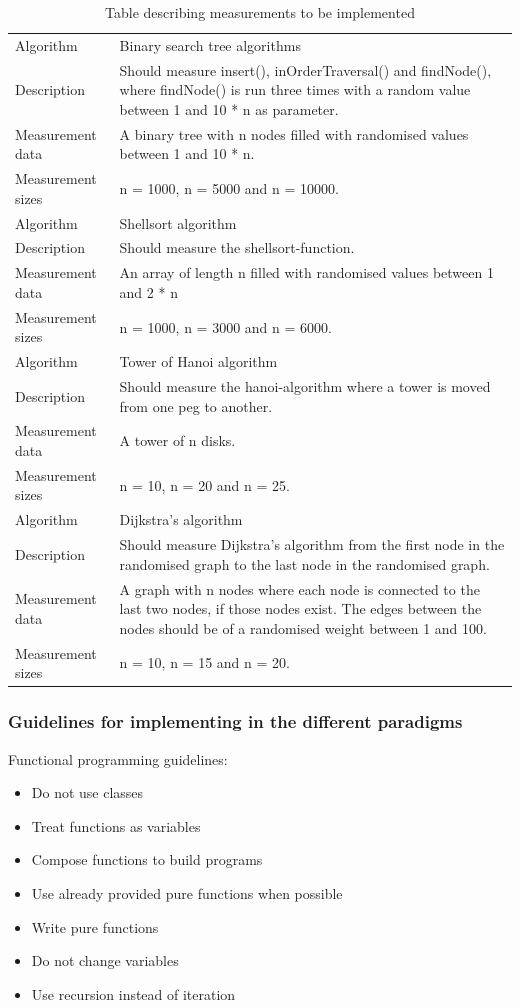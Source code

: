 \documentclass {article}
\begin{document}
\begin{table}[H]
\begin{tabular}{ | l p{10cm} | }
\hline
Algorithm & Binary search tree algorithms \\
Description & Should measure insert(), inOrderTraversal() and findNode(), where findNode() is run three times with a random value between 1 and 10 * n as parameter. \\
Measurement data & A binary tree with n nodes filled with randomised values between 1 and 10 * n. \\ 
Measurement sizes & n = 1000, n = 5000 and n = 10000. \\
\hline
Algorithm & Shellsort algorithm \\
Description & Should measure the shellsort-function.\\
Measurement data & An array of length n filled with randomised values between 1 and 2 * n \\ 
Measurement sizes & n = 1000, n = 3000 and n = 6000. \\
\hline
Algorithm & Tower of Hanoi algorithm \\
Description & Should measure the hanoi-algorithm where a tower is moved from one peg to another. \\
Measurement data & A tower of n disks. \\ 
Measurement sizes & n = 10, n = 20 and n = 25. \\
\hline
Algorithm & Dijkstra's algorithm \\
Description & Should measure Dijkstra's algorithm from the first node in the randomised graph to the last node in the randomised graph.\\
Measurement data & A graph with n nodes where each node is connected to the last two nodes, if those nodes exist. The edges between the nodes should be of a randomised weight between 1 and 100.\\ 
Measurement sizes & n = 10, n = 15 and n = 20. \\
\hline
\end{tabular}
\caption{Table describing measurements to be implemented}
\label{tab:measurements}
\end{table}
\subsubsection{Guidelines for implementing in the different paradigms}
\label{sec:paradigm-guidelines}
Functional programming guidelines:
\begin{itemize}
\item Do not use classes
\item Treat functions as variables
\item Compose functions to build programs
\item Use already provided pure functions when possible
\item Write pure functions
\item Do not change variables
\item Use recursion instead of iteration
\end{itemize}
\end{document}
